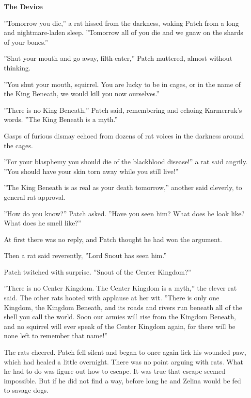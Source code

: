 \documentclass[11pt]{article}
\begin{document}
\par
{\bf The Device\par
}\par
 ''Tomorrow you die,'' a rat hissed from the darkness, waking Patch from a long and nightmare-laden sleep. ''Tomorrow all of you die and we gnaw on the shards of your bones.''\par
 ''Shut your mouth and go away, filth-eater,'' Patch muttered, almost without thinking.\par
 ''You shut your mouth, squirrel. You are lucky to be in cages, or in the name of the King Beneath, we would kill you now ourselves.''\par
 ''There is no King Beneath,'' Patch said, remembering and echoing Karmerruk's words. ''The King Beneath is a myth.''\par
 Gasps of furious dismay echoed from dozens of rat voices in the darkness around the cages.\par
 ''For your blasphemy you should die of the blackblood disease!'' a rat said angrily. ''You should have your skin torn away while you still live!''\par
 ''The King Beneath is as real as your death tomorrow,'' another said cleverly, to general rat approval.\par
 ''How do you know?'' Patch asked. ''Have you seen him? What does he look like? What does he smell like?''\par
 At first there was no reply, and Patch thought he had won the argument.\par
 Then a rat said reverently, ''Lord Snout has seen him.''\par
 Patch twitched with surprise. ''Snout of the Center Kingdom?''\par
 ''There is no Center Kingdom. The Center Kingdom is a myth,'' the clever rat said. The other rats hooted with applause at her wit. ''There is only one Kingdom, the Kingdom Beneath, and its roads and rivers run beneath all of the shell you call the world. Soon our armies will rise from the Kingdom Beneath, and no squirrel will ever speak of the Center Kingdom again, for there will be none left to remember that name!''\par
 The rats cheered. Patch fell silent and began to once again lick his wounded paw, which had healed a little overnight. There was no point arguing with rats. What he had to do was figure out how to escape. It was true that escape seemed impossible. But if he did not find a way, before long he and Zelina would be fed to savage dogs.\par
\end{document}
